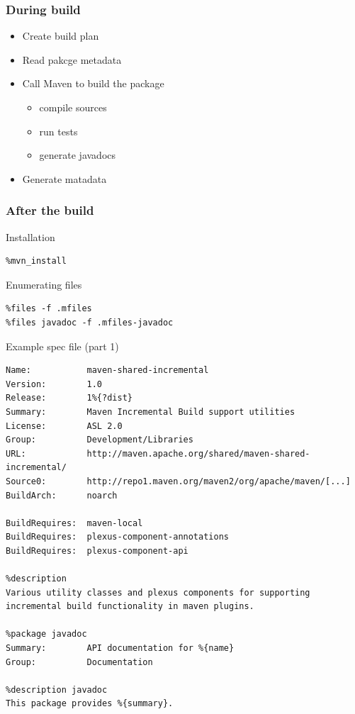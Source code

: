 \documentclass[pdftex,unicode,xcolor=table]{beamer}
\begin{document}
\begin{frame}
  \frametitle{During build}
  \begin{itemize}
    \item Create build plan
    \item Read pakcge metadata
    \item Call Maven to build the package
    \begin{itemize}
      \item compile sources
      \item run tests
      \item generate javadocs
    \end{itemize}
    \item Generate matadata
  \end{itemize}
\end{frame}


\begin{frame}[fragile]
  \frametitle{After the build}
  \begin{block}{Installation}
    \scriptsize
\begin{verbatim}
%mvn_install
\end{verbatim}
  \end{block}
  \begin{block}{Enumerating files}
    \scriptsize
\begin{verbatim}
%files -f .mfiles
%files javadoc -f .mfiles-javadoc
\end{verbatim}
  \end{block}
\end{frame}


\begin{frame}[fragile]
  \begin{block}{Example spec file (part 1)}
    \scriptsize
\begin{verbatim}
Name:           maven-shared-incremental
Version:        1.0
Release:        1%{?dist}
Summary:        Maven Incremental Build support utilities
License:        ASL 2.0
Group:          Development/Libraries
URL:            http://maven.apache.org/shared/maven-shared-incremental/
Source0:        http://repo1.maven.org/maven2/org/apache/maven/[...]
BuildArch:      noarch

BuildRequires:  maven-local
BuildRequires:  plexus-component-annotations
BuildRequires:  plexus-component-api

%description
Various utility classes and plexus components for supporting
incremental build functionality in maven plugins.

%package javadoc
Summary:        API documentation for %{name}
Group:          Documentation

%description javadoc
This package provides %{summary}.
\end{verbatim}
  \end{block}
\end{frame}
\end{document}
